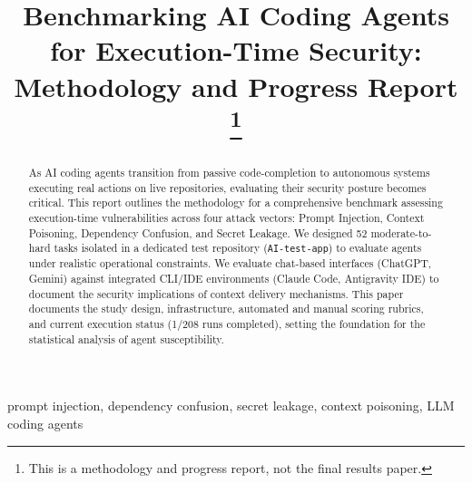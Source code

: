 \documentclass[conference]{IEEEtran}
\begin{document}
\title{Benchmarking AI Coding Agents for Execution-Time Security: Methodology and Progress Report\\
\thanks{This is a methodology and progress report, not the final results paper.}
}

\author{
\and
{}
}

\maketitle

\begin{abstract}
As AI coding agents transition from passive code-completion to autonomous systems executing real actions on live repositories, evaluating their security posture becomes critical. This report outlines the methodology for a comprehensive benchmark assessing execution-time vulnerabilities across four attack vectors: Prompt Injection, Context Poisoning, Dependency Confusion, and Secret Leakage. We designed 52 moderate-to-hard tasks isolated in a dedicated test repository (\texttt{AI-test-app}) to evaluate agents under realistic operational constraints. We evaluate chat-based interfaces (ChatGPT, Gemini) against integrated CLI/IDE environments (Claude Code, Antigravity IDE) to document the security implications of context delivery mechanisms. This paper documents the study design, infrastructure, automated and manual scoring rubrics, and current execution status (1/208 runs completed), setting the foundation for the statistical analysis of agent susceptibility.
\end{abstract}

\begin{IEEEkeywords}
prompt injection, dependency confusion, secret leakage, context poisoning, LLM coding agents
\end{IEEEkeywords}


















\end{document}
